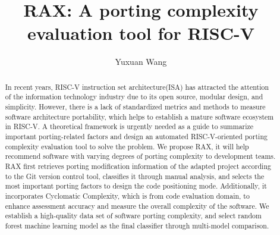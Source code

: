 \documentclass[sigconf,screen,review]{acmart}
\begin{document}
\title{RAX: A porting complexity evaluation tool for RISC-V}

\author{Yuxuan Wang}

\renewcommand{\shortauthors}{Yuxuan et al.}

\begin{abstract}
In recent years, RISC-V instruction set architecture(ISA) has attracted the attention of the information technology industry due to its open source, modular design, and simplicity.
However, there is a lack of standardized metrics and methods to measure software architecture portability, which helps to establish a mature software ecosystem in RISC-V.
A theoretical framework is urgently needed as a guide to summarize important porting-related factors and design an automated RISC-V-oriented porting complexity evaluation tool to solve the problem.
We propose RAX, it will help recommend software with varying degrees of porting complexity to development teams.
RAX first retrieves porting modification information of the adapted project according to the Git version control tool, classifies it through manual analysis, and selects the most important porting factors to design the code positioning mode.
Additionally, it incorporates Cyclomatic Complexity, which is from code evaluation domain, to enhance assessment accuracy and measure the overall complexity of the software.
We establish a high-quality data set of software porting complexity, and select random forest machine learning model as the final classifier through multi-model comparison.
\end{abstract}
\end{document}
